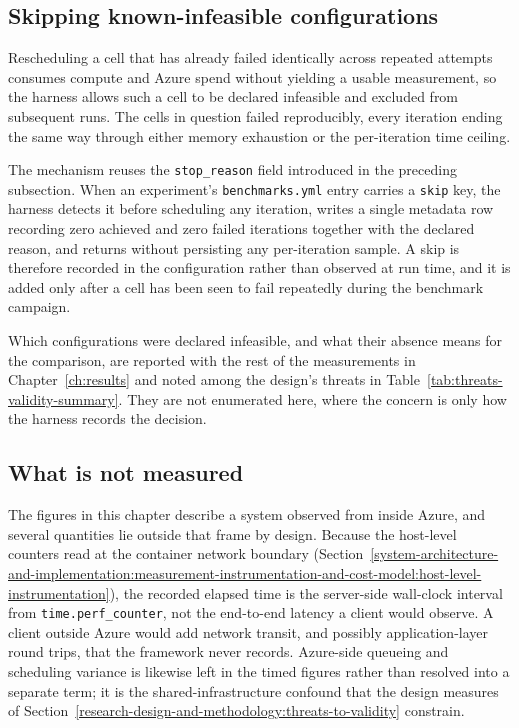 \subsection{Skipping known-infeasible configurations}
\label{system-architecture-and-implementation:measurement-instrumentation-and-cost-model:execution-outcomes-and-skipped-cells}

Rescheduling a cell that has already failed identically across repeated attempts consumes compute and Azure spend without yielding a usable measurement, so the harness allows such a cell to be declared infeasible and excluded from subsequent runs. The cells in question failed reproducibly, every iteration ending the same way through either memory exhaustion or the per-iteration time ceiling.

The mechanism reuses the \texttt{stop\_reason} field introduced in the preceding subsection. When an experiment's \texttt{benchmarks.yml} entry carries a \texttt{skip} key, the harness detects it before scheduling any iteration, writes a single metadata row recording zero achieved and zero failed iterations together with the declared reason, and returns without persisting any per-iteration sample. A skip is therefore recorded in the configuration rather than observed at run time, and it is added only after a cell has been seen to fail repeatedly during the benchmark campaign.

Which configurations were declared infeasible, and what their absence means for the comparison, are reported with the rest of the measurements in Chapter~\ref{ch:results} and noted among the design's threats in Table~\ref{tab:threats-validity-summary}. They are not enumerated here, where the concern is only how the harness records the decision.

\subsection{What is not measured}
\label{system-architecture-and-implementation:measurement-instrumentation-and-cost-model:what-is-not-measured}

The figures in this chapter describe a system observed from inside Azure, and several quantities lie outside that frame by design. Because the host-level counters read at the container network boundary (Section~\ref{system-architecture-and-implementation:measurement-instrumentation-and-cost-model:host-level-instrumentation}), the recorded elapsed time is the server-side wall-clock interval from \texttt{time.perf\_counter}, not the end-to-end latency a client would observe. A client outside Azure would add network transit, and possibly application-layer round trips, that the framework never records. Azure-side queueing and scheduling variance is likewise left in the timed figures rather than resolved into a separate term; it is the shared-infrastructure confound that the design measures of Section~\ref{research-design-and-methodology:threats-to-validity} constrain.

